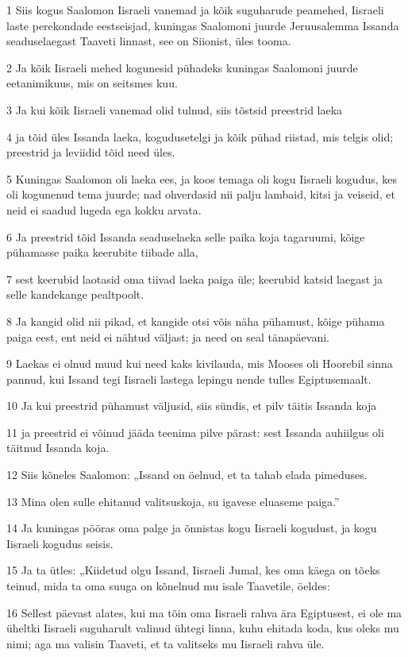 \par 1 Siis kogus Saalomon Iisraeli vanemad ja kõik suguharude peamehed, Iisraeli laste perekondade eestseisjad, kuningas Saalomoni juurde Jeruusalemma Issanda seaduselaegast Taaveti linnast, see on Siionist, üles tooma.
\par 2 Ja kõik Iisraeli mehed kogunesid pühadeks kuningas Saalomoni juurde eetanimikuus, mis on seitsmes kuu.
\par 3 Ja kui kõik Iisraeli vanemad olid tulnud, siis tõstsid preestrid laeka
\par 4 ja tõid üles Issanda laeka, kogudusetelgi ja kõik pühad riistad, mis telgis olid; preestrid ja leviidid tõid need üles.
\par 5 Kuningas Saalomon oli laeka ees, ja koos temaga oli kogu Iisraeli kogudus, kes oli kogunenud tema juurde; nad ohverdasid nii palju lambaid, kitsi ja veiseid, et neid ei saadud lugeda ega kokku arvata.
\par 6 Ja preestrid tõid Issanda seaduselaeka selle paika koja tagaruumi, kõige pühamasse paika keerubite tiibade alla,
\par 7 sest keerubid laotasid oma tiivad laeka paiga üle; keerubid katsid laegast ja selle kandekange pealtpoolt.
\par 8 Ja kangid olid nii pikad, et kangide otsi võis näha pühamust, kõige pühama paiga eest, ent neid ei nähtud väljast; ja need on seal tänapäevani.
\par 9 Laekas ei olnud muud kui need kaks kivilauda, mis Mooses oli Hoorebil sinna pannud, kui Issand tegi Iisraeli lastega lepingu nende tulles Egiptusemaalt.
\par 10 Ja kui preestrid pühamust väljusid, siis sündis, et pilv täitis Issanda koja
\par 11 ja preestrid ei võinud jääda teenima pilve pärast: sest Issanda auhiilgus oli täitnud Issanda koja.
\par 12 Siis kõneles Saalomon: „Issand on öelnud, et ta tahab elada pimeduses.
\par 13 Mina olen sulle ehitanud valitsuskoja, su igavese eluaseme paiga.”
\par 14 Ja kuningas pööras oma palge ja õnnistas kogu Iisraeli kogudust, ja kogu Iisraeli kogudus seisis.
\par 15 Ja ta ütles: „Kiidetud olgu Issand, Iisraeli Jumal, kes oma käega on tõeks teinud, mida ta oma suuga on kõnelnud mu isale Taavetile, öeldes:
\par 16 Sellest päevast alates, kui ma tõin oma Iisraeli rahva ära Egiptusest, ei ole ma üheltki Iisraeli suguharult valinud ühtegi linna, kuhu ehitada koda, kus oleks mu nimi; aga ma valisin Taaveti, et ta valitseks mu Iisraeli rahva üle.
